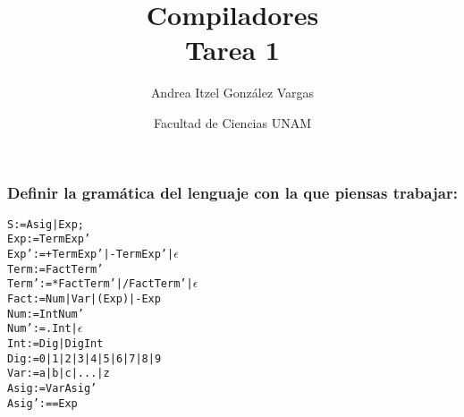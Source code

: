 \documentclass[12pt]{article}
\title{Compiladores \\ Tarea 1}
\author{Andrea Itzel González Vargas}
\date{Facultad de Ciencias UNAM}
\begin{document}
\maketitle

\subsubsection{Definir la gramática del lenguaje con la que piensas trabajar:}
\begin{alltt}
S     := Asig | Exp;
Exp   := TermExp'
Exp'  := +TermExp' | -TermExp' | \(\epsilon\)
Term  := FactTerm'
Term' := *FactTerm' | /FactTerm' | \(\epsilon\)
Fact  := Num | Var | (Exp) | -Exp
Num   := IntNum'
Num'  := .Int | \(\epsilon\)
Int   := Dig | DigInt
Dig   := 0 | 1 | 2 | 3 | 4 | 5 | 6 | 7 | 8 | 9
Var   := a | b | c | ... | z
Asig  := VarAsig'
Asig' := =Exp
\end{alltt}
\end{document}
